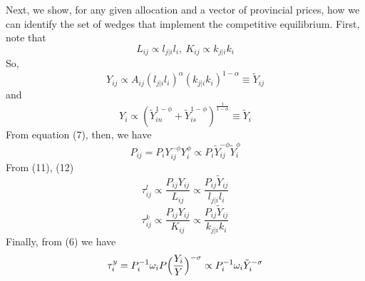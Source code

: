 \documentclass{article}
\begin{document}
\begin{prop}
    Next, we show, for any given allocation and a vector of provincial prices, how we can identify the set of wedges that implement the competitive equilibrium. First, note that
    \begin{equation*}
        L_{ij} \propto l_{j|i} l_i,\ K_{ij} \propto k_{j|i} k_i
    \end{equation*}
    So,
    \begin{equation*}
        Y_{ij} \propto A_{ij}(l_{j|i} l_i)^\alpha (k_{j|i} k_i)^{1-\alpha} \equiv \tilde{Y}_{ij}
    \end{equation*}
    and
    \begin{equation*}
        Y_i \propto (\tilde{Y}_{in}^{1-\phi} + \tilde{Y}_{is}^{1-\phi})^{\frac{1}{1-\phi}} \equiv \tilde{Y}_i
    \end{equation*}
    From equation (7), then, we have
    \begin{equation*}
        P_{ij}=P_i Y_{ij}^{-\phi} Y_i^\phi \propto P_i \tilde{Y}_{ij}^{-\phi} \tilde{Y}_i^\phi
    \end{equation*}
    From (11), (12)
    \begin{equation}
        \tau_{ij}^l \propto \frac{P_{ij} Y_{ij}}{L_{ij}} \propto \frac{P_{ij} \tilde{Y}_{ij}}{l_{j|i} l_i}
    \end{equation}
    \begin{equation}
        \tau_{ij}^k \propto \frac{P_{ij} Y_{ij}}{K_{ij}} \propto \frac{P_{ij} \tilde{Y}_{ij}}{k_{j|i} k_i}
    \end{equation}
    Finally, from (6) we have
    \begin{equation}
        \tau_i^y=P_i^{-1} \omega_i P \Bigl( \frac{Y_i}{Y} \Bigr)^{-\sigma} \propto P_i^{-1} \omega_i \tilde{Y}_i^{-\sigma}
    \end{equation}
\end{prop}
\end{document}
